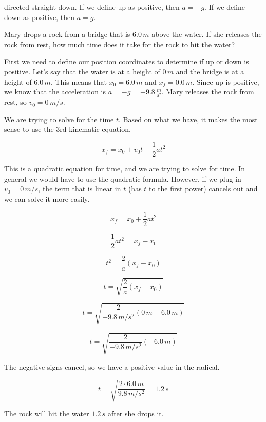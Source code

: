 \documentclass[12pt]{book}
\begin{document}
directed straight down. If we define up as positive, then $a = -g$. If we define down as positive, then $a = g$.

\begin{exampleblock}

Mary drops a rock from a bridge that is $6.0 \, m$ above the water. If she releases the rock from rest, how much time does it take for the rock to hit the water?

\hspace{10pt}

First we need to define our position coordinates to determine if up or down is positive. Let's say that the water is at a height of $0 \, m$ and the bridge is at a height of $6.0 \, m$. This means that $x_0 = 6.0 \, m$ and $x_f = 0.0 \, m$. Since up is positive, we know that the acceleration is $a = -g = -9.8 \, \frac{m}{s^2}$. Mary releases the rock from rest, so $v_0 = 0 \, m/s$.

We are trying to solve for the time $t$. Based on what we have, it makes the most sense to use the 3rd kinematic equation.

\begin{equation}
x_f = x_0 + v_0 t + \frac{1}{2} a t^2
\end{equation}

This is a quadratic equation for time, and we are trying to solve for time. In general we would have to use the quadratic formula. However, if we plug in $v_0 = 0 \, m/s$, the term that is linear in $t$ (has $t$ to the first power) cancels out and we can solve it more easily.

\begin{equation}
x_f = x_0 + \frac{1}{2} a t^2
\end{equation}

\begin{equation}
\frac{1}{2} a t^2 = x_f - x_0
\end{equation}

\begin{equation}
t^2 = \frac{2}{a} (x_f - x_0)
\end{equation}

\begin{equation}
t = \sqrt{\frac{2}{a} (x_f - x_0)}
\end{equation}

\begin{equation}
t = \sqrt{\frac{2}{-9.8 \, m/s^2} (0 \, m - 6.0 \, m)}
\end{equation}

\begin{equation}
t = \sqrt{\frac{2}{-9.8 \, m/s^2} (-6.0 \, m)}
\end{equation}

The negative signs cancel, so we have a positive value in the radical.

\begin{equation}
t = \sqrt{\frac{2 \cdot 6.0 \, m}{9.8 \, m/s^2}} = 1.2 \, s
\end{equation}

The rock will hit the water $1.2 \, s$ after she drops it.

\end{exampleblock}
\end{document}
